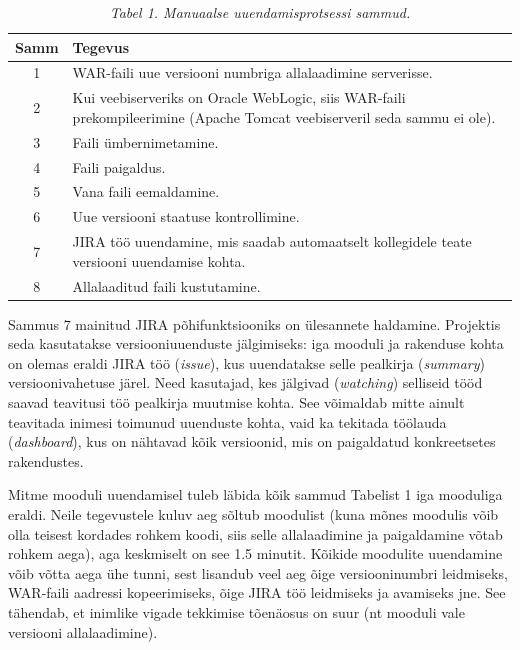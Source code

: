 \documentclass[12pt]{article}
\begin{document}
  \begin{table}[H]
    \caption*{\textit{Tabel 1. Manuaalse uuendamisprotsessi sammud.}}
  
    \begin{tabular}{ |c|p{11cm}| }
      \hline
      \textbf{Samm} & \textbf{Tegevus}\\
      \hline
      1 & WAR\--faili uue versiooni numbriga allalaadimine serverisse.\\
      \hline
      2 & Kui veebiserveriks on Oracle WebLogic, siis WAR\--faili prekompileerimine (Apache Tomcat veebiserveril seda sammu ei ole).\\
      \hline
      3 & Faili ümbernimetamine.\\
      \hline
      4 & Faili paigaldus.\\
      \hline
      5 & Vana faili eemaldamine.\\
      \hline
      6 & Uue versiooni staatuse kontrollimine.\\
      \hline
      7 & JIRA\footnotemark{} töö uuendamine, mis saadab automaatselt kollegidele teate versiooni uuendamise kohta.\\
      \hline
      8 & Allalaaditud faili kustutamine.\\
      \hline
    \end{tabular}
  \end{table}
  
  
  Sammus 7 mainitud JIRA põhifunktsiooniks on ülesannete haldamine. Projektis seda kasutatakse versiooniuuenduste jälgimiseks: iga mooduli ja rakenduse kohta on olemas eraldi JIRA töö (\textit{issue}), kus uuendatakse selle pealkirja (\textit{summary}) versioonivahetuse järel. Need kasutajad, kes jälgivad (\textit{watching}) selliseid tööd saavad teavitusi töö pealkirja muutmise kohta. See võimaldab mitte ainult teavitada inimesi toimunud uuenduste kohta, vaid ka tekitada töölauda (\textit{dashboard}), kus on nähtavad kõik versioonid, mis on paigaldatud konkreetsetes rakendustes.
  
  Mitme mooduli uuendamisel tuleb läbida kõik sammud Tabelist 1 iga mooduliga eraldi. Neile tegevustele kuluv aeg sõltub moodulist (kuna mõnes moodulis võib olla teisest kordades rohkem koodi, siis selle allalaadimine ja paigaldamine võtab rohkem aega), aga keskmiselt on see 1.5 minutit. Kõikide moodulite uuendamine võib võtta aega ühe tunni, sest lisandub veel aeg õige versiooninumbri leidmiseks, WAR\--faili aadressi kopeerimiseks, õige JIRA töö leidmiseks ja avamiseks jne. See tähendab, et inimlike vigade tekkimise tõenäosus on suur (nt mooduli vale versiooni allalaadimine).
  
\end{document}
